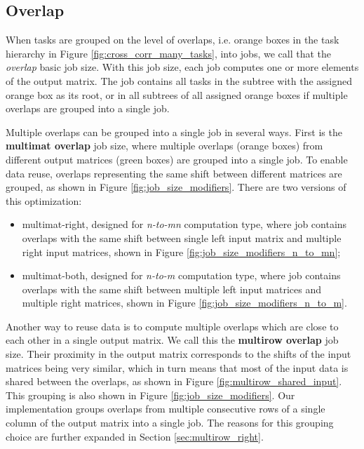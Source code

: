 \subsection{Overlap}
\label{sec:data_reuse_overlap}

When tasks are grouped on the level of overlaps, i.e. orange boxes in the task hierarchy in Figure \ref{fig:cross_corr_many_tasks}, into jobs, we call that the \textit{overlap} basic job size. With this job size, each job computes one or more elements of the output matrix. The job contains all tasks in the subtree with the assigned orange box as its root, or in all subtrees of all assigned orange boxes if multiple overlaps are grouped into a single job.

Multiple overlaps can be grouped into a single job in several ways. First is the \textbf{multimat overlap} job size, where multiple overlaps (orange boxes) from different output matrices (green boxes) are grouped into a single job. To enable data reuse, overlaps representing the same shift between different matrices are grouped, as shown in Figure \ref{fig:job_size_modifiers}. There are two versions of this optimization:
\begin{itemize}
	\item multimat-right, designed for \textit{n-to-mn} computation type, where job contains overlaps with the same shift between single left input matrix and multiple right input matrices, shown in Figure \ref{fig:job_size_modifiers_n_to_mn};
	\item multimat-both, designed for \textit{n-to-m} computation type, where job contains overlaps with the same shift between multiple left input matrices and multiple right matrices, shown in Figure \ref{fig:job_size_modifiers_n_to_m}.
\end{itemize}

Another way to reuse data is to compute multiple overlaps which are close to each other in a single output matrix. 
We call this the \textbf{multirow overlap} job size. Their proximity in the output matrix corresponds to the shifts of the input matrices being very similar, which in turn means that most of the input data is shared between the overlaps, as shown in Figure \ref{fig:multirow_shared_input}. This grouping is also shown in Figure \ref{fig:job_size_modifiers}. Our implementation groups overlaps from multiple consecutive rows of a single column of the output matrix into a single job. The reasons for this grouping choice are further expanded in Section \ref{sec:multirow_right}.

